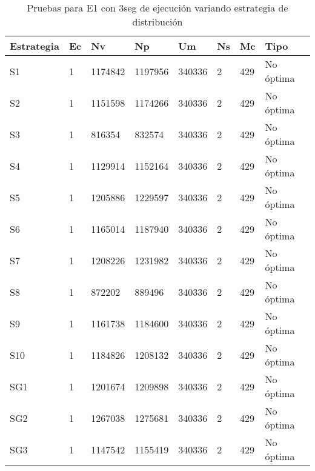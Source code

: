 \begin{center}
\begin{longtable}{|p{3cm}|p{1.0cm}|p{1.6cm}|p{1.6cm}|p{1.1cm}|p{1.1cm}|p{1.1cm}|p{2.7cm}|}
	\caption{Pruebas para E1 con 3seg de ejecución variando estrategia de distribución} \\
	\hline
	\cellcolor[gray]{0.9} \textbf{Estrategia} & \cellcolor[gray]{0.9}\textbf{Ec} & \cellcolor[gray]{0.9}\textbf{Nv} & \cellcolor[gray]{0.9}\textbf{Np} & \cellcolor[gray]{0.9}\textbf{Um} & \cellcolor[gray]{0.9}\textbf{Ns} &  \cellcolor[gray]{0.9}\textbf{Mc} & \cellcolor[gray]{0.9}\textbf{Tipo}\\
	\hline
	S1 &1 &1174842 &1197956 &340336 &2 &429& No óptima \\
	\hline
	S2 &1 &1151598 &1174266  &340336  &2 &429& No óptima \\
	\hline
	S3 &1 &816354  &832574  &340336  &2 &429& No óptima \\
	\hline
	S4 &1 &1129914 &1152164  &340336  &2 &429& No óptima \\
	\hline
	S5 &1 &1205886 &1229597  &340336  &2 &429& No óptima \\
	\hline
	S6 &1 &1165014 &1187940  &340336  &2 &429& No óptima \\
	\hline
	S7 &1 &1208226 &1231982  &340336  &2 &429& No óptima \\
	\hline
	S8 &1 &872202  &889496  &340336  &2 &429& No óptima \\
	\hline
	S9 &1 &1161738  &1184600  &340336  &2 &429& No óptima \\
	\hline
	S10 &1 &1184826  &1208132  &340336  &2 &429& No óptima \\
	\hline
	SG1 &1 &1201674  &1209898  &340336  &2 &429& No óptima \\
	\hline
	SG2 &1 &1267038  &1275681  &340336  &2 &429& No óptima \\
	\hline
	SG3  &1 &1147542  &1155419  &340336  &2 &429& No óptima \\
	\hline
\end{longtable}	
\end{center}

